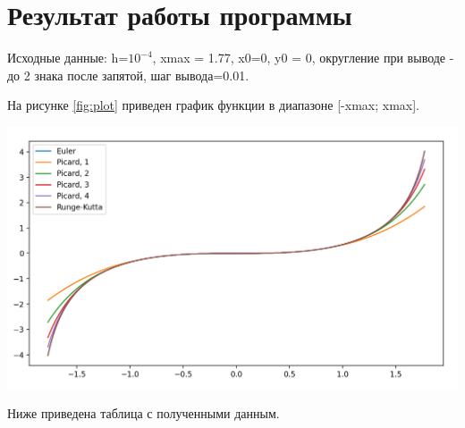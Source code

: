 \documentclass[12pt]{report}
\begin{document}
\chapter{Результат работы программы}

Исходные данные: h=$10^{-4}$, xmax = 1.77, x0=0, y0 = 0, округление при выводе - до 2 знака после запятой, шаг вывода=0.01.


На рисунке \ref{fig:plot} приведен график функции в диапазоне [-xmax; xmax].

\includegraphics[scale=0.6]{img/plot}\label{fig:plot}

Ниже приведена таблица с полученными данным.
\end{document}
